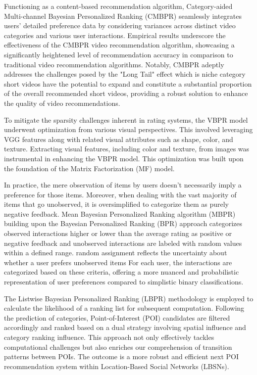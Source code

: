 \documentclass[journal]{IEEEtran}
\begin{document}
Functioning as a content-based recommendation algorithm, Category-aided Multi-channel Bayesian Personalized Ranking (CMBPR) \cite{8689028} 
seamlessly integrates users' detailed preference data by considering variances across distinct video categories and various user interactions. 
Empirical results underscore the effectiveness of the CMBPR video recommendation algorithm, showcasing a significantly heightened level of 
recommendation accuracy in comparison to traditional video recommendation algorithms. Notably, CMBPR adeptly addresses the challenges posed 
by the "Long Tail" effect which is niche category short videos have the potential to expand and constitute a substantial proportion 
of the overall recommended short videos, providing a robust solution to enhance the quality of video recommendations.

To mitigate the sparsity challenges inherent in rating systems, the VBPR model \cite{Liang2020497} underwent optimization from various visual 
perspectives. This involved leveraging VGG features along with related visual attributes such as shape, color, and texture. 
Extracting visual features, including color and texture, from images was instrumental in enhancing the VBPR model. This 
optimization was built upon the foundation of the Matrix Factorization (MF) model.

In practice, the mere observation of items by users doesn't necessarily imply a preference for those items. Moreover, when 
dealing with the vast majority of items that go unobserved, it is oversimplified to categorize them as purely negative feedback. 
Mean Bayesian Personalized Ranking algorithm (MBPR) \cite{8946325} building upon the Bayesian Personalized Ranking (BPR) approach
categorizes observed interactions higher or lower than the average rating as positive or negative feedback and unobserved interactions 
are labeled with random values within a defined range. random assignment reflects the uncertainty about whether a user prefers 
unobserved items For each user, the interactions are categorized based on these criteria, offering a more nuanced and probabilistic
representation of user preferences compared to simplistic binary classifications.

The Listwise Bayesian Personalized Ranking (LBPR) \cite{He20171837} methodology is employed to calculate the likelihood of a ranking list for 
subsequent computation. Following the prediction of categories, Point-of-Interest (POI) candidates are filtered accordingly and 
ranked based on a dual strategy involving spatial influence and category ranking influence. This approach not only effectively 
tackles computational challenges but also enriches our comprehension of transition patterns between POIs. The outcome is a more 
robust and efficient next POI recommendation system within Location-Based Social Networks (LBSNs).
\end{document}
